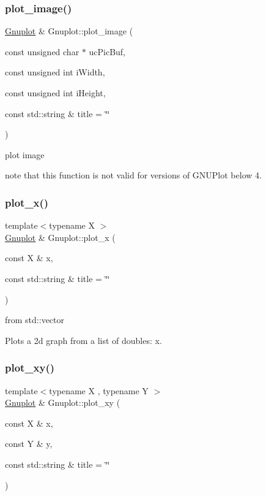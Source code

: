 \subsubsection{\texorpdfstring{plot\+\_\+image()}{plot\_image()}}
{\footnotesize\ttfamily \hyperlink{classGnuplot}{Gnuplot} \& Gnuplot\+::plot\+\_\+image (\begin{DoxyParamCaption}\item[{const unsigned char $\ast$}]{uc\+Pic\+Buf,  }\item[{const unsigned int}]{i\+Width,  }\item[{const unsigned int}]{i\+Height,  }\item[{const std\+::string \&}]{title = {\ttfamily \char`\"{}\char`\"{}} }\end{DoxyParamCaption})}



plot image 


\begin{DoxyItemize}
\item note that this function is not valid for versions of G\+N\+U\+Plot below 4. 
\end{DoxyItemize}\mbox{\label{classGnuplot_a80f3b2baae2bceff78ad005d9c3ec3fb}} 
\subsubsection{\texorpdfstring{plot\+\_\+x()}{plot\_x()}}
{\footnotesize\ttfamily template$<$typename X $>$ \\
\hyperlink{classGnuplot}{Gnuplot} \& Gnuplot\+::plot\+\_\+x (\begin{DoxyParamCaption}\item[{const X \&}]{x,  }\item[{const std\+::string \&}]{title = {\ttfamily \char`\"{}\char`\"{}} }\end{DoxyParamCaption})}



from std\+::vector 

Plots a 2d graph from a list of doubles\+: x. \mbox{\label{classGnuplot_a0514a7391de6b42e79732ce746c310f7}} 
\subsubsection{\texorpdfstring{plot\+\_\+xy()}{plot\_xy()}}
{\footnotesize\ttfamily template$<$typename X , typename Y $>$ \\
\hyperlink{classGnuplot}{Gnuplot} \& Gnuplot\+::plot\+\_\+xy (\begin{DoxyParamCaption}\item[{const X \&}]{x,  }\item[{const Y \&}]{y,  }\item[{const std\+::string \&}]{title = {\ttfamily \char`\"{}\char`\"{}} }\end{DoxyParamCaption})}



